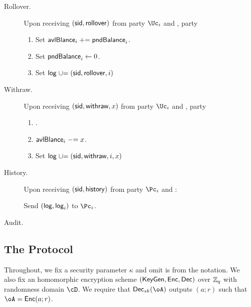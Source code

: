 \begin{functionality}
\begin{description}
		\item[Rollover.]     Upon receiving $(\mathsf{sid},\mathsf{rollover})$ from  party $\Uc_i$ and \Cc,  party \Cc
		
		\begin{enumerate}
			
			
			\item Set $\mathsf{avlBlance}_i  \mathrel{+}= \mathsf{pndBalance}_i$.
			
			\item Set $\mathsf{pndBalance}_i  \leftarrow 0$.
			
			\item Set $\mathsf{log} \mathrel{\cup}= (\mathsf{sid},\mathsf{rollover},i)$
			
			
		\end{enumerate}

		
			\item[Withraw.]     Upon receiving $(\mathsf{sid},\mathsf{withraw},x)$ from  party $\Uc_i$ and \Cc,  party \Cc
		
		\begin{enumerate}
			
			
			 \item \Assert{$x\in \N$, $\balance_i  \ge x$ and $i \in [n]$}.
			
			\item $\mathsf{avlBlance}_i \mathrel{-}= x$.
			
			
			\item Set $\mathsf{log} \mathrel{\cup}= {(\mathsf{sid},\mathsf{withraw},i,x)}$
			
			
		\end{enumerate}
		
		
		\item[History.]     Upon receiving $(\mathsf{sid},\mathsf{history})$ from  party $\Pc_i$ and \Cc:  
		
		Send $(\mathsf{log},\mathsf{log}_i)$ to  $\Pc_i$.	 
		
		\item[Audit.]      
		
	\end{description}

\end{functionality}


\subsection{The Protocol}\label{sec:MainProtocol:Protocol}
Throughout, we fix a security parameter $\kappa$ and omit is from the notation. We also fix an homomorphic encryption scheme $(\mathsf{KeyGen},\mathsf{Enc},\mathsf{Dec})$ over ${\mathbb Z}_q$ with randomness domain $\cD$.  We require that $\Dec_{sk}(\oA)$ outputs   $(a;r)$ such that $\oA = \Enc(a;r)$.


